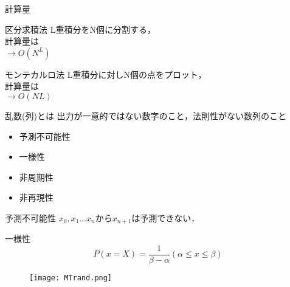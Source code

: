 \documentclass[dvipdfmx,xcolor={svgnames}]{beamer}
\begin{document}
  \begin{frame}{計算量}
    \begin{block}{区分求積法}
      L重積分をN個に分割する，\\ 計算量は \\
      $\rightarrow O(N^L)$
    \end{block}
    \begin{block}{モンテカルロ法}
      L重積分に対しN個の点をプロット，\\ 計算量は \\
      $\rightarrow O(NL)$
    \end{block}
  \end{frame}

  \begin{frame}{乱数(列)とは}
    出力が一意的ではない数字のこと，法則性がない数列のこと
    \begin{itemize}
      \item 予測不可能性
      \item 一様性
      \item 非周期性
      \item 非再現性
    \end{itemize}
  \end{frame}

  \begin{frame}{予測不可能性}
    $x_0,x_1\ldots x_n$から$x_{n+1}$は予測できない．
  \end{frame}

    \begin{frame}{一様性}
      \begin{equation*}
        P(x=X) = \frac{1}{\beta - \alpha} (\alpha \leq x \leq \beta)
      \end{equation*}
      \begin{figure}[htbp]
        \centering
        \texttt{[image: MTrand.png]}
      \end{figure}
    \end{frame}
\end{document}
